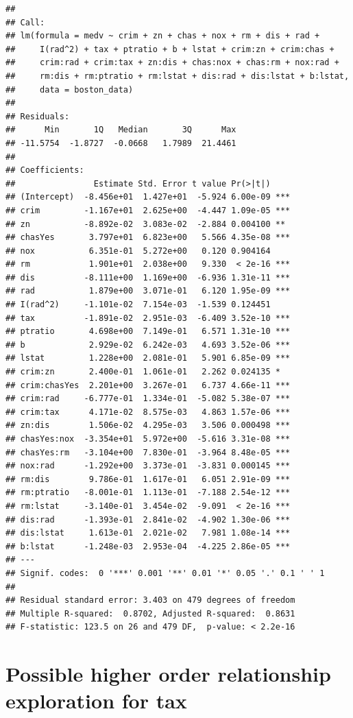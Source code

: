 \documentclass[
]{article}
\begin{document}
\begin{verbatim}
## 
## Call:
## lm(formula = medv ~ crim + zn + chas + nox + rm + dis + rad + 
##     I(rad^2) + tax + ptratio + b + lstat + crim:zn + crim:chas + 
##     crim:rad + crim:tax + zn:dis + chas:nox + chas:rm + nox:rad + 
##     rm:dis + rm:ptratio + rm:lstat + dis:rad + dis:lstat + b:lstat, 
##     data = boston_data)
## 
## Residuals:
##      Min       1Q   Median       3Q      Max 
## -11.5754  -1.8727  -0.0668   1.7989  21.4461 
## 
## Coefficients:
##                Estimate Std. Error t value Pr(>|t|)    
## (Intercept)  -8.456e+01  1.427e+01  -5.924 6.00e-09 ***
## crim         -1.167e+01  2.625e+00  -4.447 1.09e-05 ***
## zn           -8.892e-02  3.083e-02  -2.884 0.004100 ** 
## chasYes       3.797e+01  6.823e+00   5.566 4.35e-08 ***
## nox           6.351e-01  5.272e+00   0.120 0.904164    
## rm            1.901e+01  2.038e+00   9.330  < 2e-16 ***
## dis          -8.111e+00  1.169e+00  -6.936 1.31e-11 ***
## rad           1.879e+00  3.071e-01   6.120 1.95e-09 ***
## I(rad^2)     -1.101e-02  7.154e-03  -1.539 0.124451    
## tax          -1.891e-02  2.951e-03  -6.409 3.52e-10 ***
## ptratio       4.698e+00  7.149e-01   6.571 1.31e-10 ***
## b             2.929e-02  6.242e-03   4.693 3.52e-06 ***
## lstat         1.228e+00  2.081e-01   5.901 6.85e-09 ***
## crim:zn       2.400e-01  1.061e-01   2.262 0.024135 *  
## crim:chasYes  2.201e+00  3.267e-01   6.737 4.66e-11 ***
## crim:rad     -6.777e-01  1.334e-01  -5.082 5.38e-07 ***
## crim:tax      4.171e-02  8.575e-03   4.863 1.57e-06 ***
## zn:dis        1.506e-02  4.295e-03   3.506 0.000498 ***
## chasYes:nox  -3.354e+01  5.972e+00  -5.616 3.31e-08 ***
## chasYes:rm   -3.104e+00  7.830e-01  -3.964 8.48e-05 ***
## nox:rad      -1.292e+00  3.373e-01  -3.831 0.000145 ***
## rm:dis        9.786e-01  1.617e-01   6.051 2.91e-09 ***
## rm:ptratio   -8.001e-01  1.113e-01  -7.188 2.54e-12 ***
## rm:lstat     -3.140e-01  3.454e-02  -9.091  < 2e-16 ***
## dis:rad      -1.393e-01  2.841e-02  -4.902 1.30e-06 ***
## dis:lstat     1.613e-01  2.021e-02   7.981 1.08e-14 ***
## b:lstat      -1.248e-03  2.953e-04  -4.225 2.86e-05 ***
## ---
## Signif. codes:  0 '***' 0.001 '**' 0.01 '*' 0.05 '.' 0.1 ' ' 1
## 
## Residual standard error: 3.403 on 479 degrees of freedom
## Multiple R-squared:  0.8702, Adjusted R-squared:  0.8631 
## F-statistic: 123.5 on 26 and 479 DF,  p-value: < 2.2e-16
\end{verbatim}

\section{Possible higher order relationship exploration for
tax}\label{possible-higher-order-relationship-exploration-for-tax}
\end{document}
